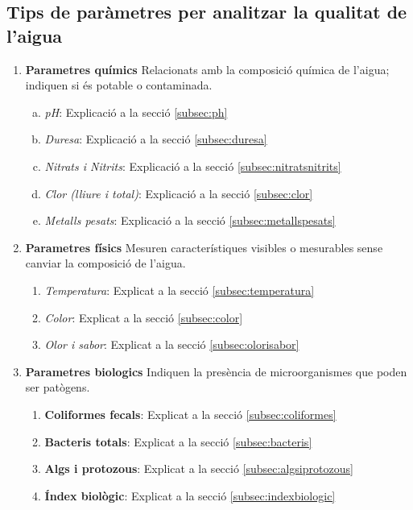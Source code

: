 \subsection{Tips de paràmetres per analitzar la qualitat de l'aigua}
\begin{enumerate}[1)]
 \item \textbf{Parametres químics}
 Relacionats amb la composició química de l’aigua; indiquen si és potable o contaminada.
 \begin{enumerate}[a)]
  \item \textit{pH}: Explicació a la secció \ref{subsec:ph}
  \item \textit{Duresa}: Explicació a la secció  \ref{subsec:duresa}
  \item \textit{Nitrats i Nitrits}: Explicació a la secció  \ref{subsec:nitratsnitrits}
  \item \textit{Clor (lliure i total)}: Explicació a la secció  \ref{subsec:clor}
  \item \textit{Metalls pesats}: Explicació a la secció   \ref{subsec:metallspesats}
 \end{enumerate}
 \item \textbf{Parametres físics}
 Mesuren característiques visibles o mesurables sense canviar la composició de l’aigua.
 \begin{enumerate}
  \item \textit{Temperatura}: Explicat a la secció \ref{subsec:temperatura}
  \item \textit{Color}: Explicat a la secció \ref{subsec:color}
  \item \textit{Olor i sabor}: Explicat a la secció \ref{subsec:olorisabor}
 \end{enumerate}
 \item \textbf{Parametres biologics}
 Indiquen la presència de microorganismes que poden ser patògens.
 \begin{enumerate}
  \item \textbf{Coliformes fecals}: Explicat a la secció \ref{subsec:coliformes}
  \item \textbf{Bacteris totals}: Explicat a la secció \ref{subsec:bacteris}
  \item \textbf{Algs i protozous}: Explicat a la secció \ref{subsec:algsiprotozous}
  \item \textbf{Índex biològic}: Explicat a la secció \ref{subsec:indexbiologic}

 \end{enumerate}

\end{enumerate}

